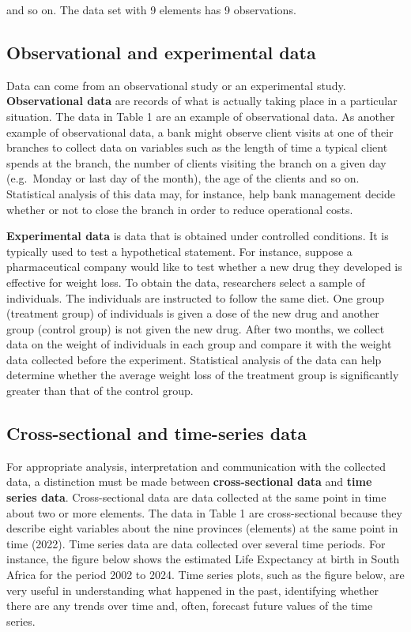 \documentclass[
]{book}
\begin{document}
and so on. The data set with 9 elements has 9 observations.

\subsection{Observational and experimental data}\label{observational-and-experimental-data}

Data can come from an observational study or an experimental study. \textbf{Observational data} are records of what is actually taking place in a particular situation. The data in Table 1 are an example of observational data. As another example of observational data, a bank might observe client visits at one of their branches to collect data on variables such as the length of time a typical client spends at the branch, the number of clients visiting the branch on a given day (e.g.~Monday or last day of the month), the age of the clients and so on. Statistical analysis of this data may, for instance, help bank management decide whether or not to close the branch in order to reduce operational costs.

\textbf{Experimental data} is data that is obtained under controlled conditions. It is typically used to test a hypothetical statement. For instance, suppose a pharmaceutical company would like to test whether a new drug they developed is effective for weight loss. To obtain the data, researchers select a sample of individuals. The individuals are instructed to follow the same diet. One group (treatment group) of individuals is given a dose of the new drug and another group (control group) is not given the new drug. After two months, we collect data on the weight of individuals in each group and compare it with the weight data collected before the experiment. Statistical analysis of the data can help determine whether the average weight loss of the treatment group is significantly greater than that of the control group.~

\subsection{Cross-sectional and time-series data}\label{cross-sectional-and-time-series-data}

For appropriate analysis, interpretation and communication with the collected data, a distinction must be made between \textbf{cross-sectional data} and \textbf{time series data}. Cross-sectional data are data collected at the same point in time about two or more elements. The data in Table 1 are cross-sectional because they describe eight variables about the nine provinces (elements) at the same point in time (2022). Time series data are data collected over several time periods. For instance, the figure below shows the estimated Life Expectancy at birth in South Africa for the period 2002 to 2024. Time series plots, such as the figure below, are very useful in understanding what happened in the past, identifying whether there are any trends over time and, often, forecast future values of the time series.
\end{document}
